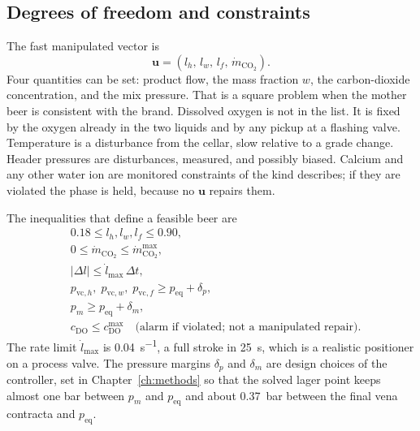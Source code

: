 \subsection{Degrees of freedom and constraints}

The fast manipulated vector is
\begin{equation}
\label{eq:u}
\mathbf{u} = (l_h,\, l_w,\, l_f,\, \dot m_{\mathrm{CO_2}}).
\end{equation}
Four quantities can be set: product flow, the mass fraction $w$, the carbon-dioxide concentration, and the mix pressure. That is a square problem when the mother beer is consistent with the brand. Dissolved oxygen is not in the list. It is fixed by the oxygen already in the two liquids and by any pickup at a flashing valve. Temperature is a disturbance from the cellar, slow relative to a grade change. Header pressures are disturbances, measured, and possibly biased. Calcium and any other water ion are monitored constraints of the kind \citet{palmer2013} describes; if they are violated the phase is held, because no $\mathbf{u}$ repairs them.

The inequalities that define a feasible beer are
\begin{align}
\label{eq:ineq}
&0.18 \le l_h,l_w,l_f \le 0.90,
\\
&0 \le \dot m_{\mathrm{CO_2}} \le \dot m_{\mathrm{CO_2}}^{\max},
\\
&|\Delta l| \le \dot l_{\max}\,\Delta t,
\\
&p_{\mathrm{vc},h},\; p_{\mathrm{vc},w},\; p_{\mathrm{vc},f} \ge p_{\mathrm{eq}} + \delta_p,
\\
&p_m \ge p_{\mathrm{eq}} + \delta_m,
\\
&c_{\mathrm{DO}} \le c_{\mathrm{DO}}^{\max}
\quad\text{(alarm if violated; not a manipulated repair)}.
\end{align}
The rate limit $\dot l_{\max}$ is \SI{0.04}{s^{-1}}, a full stroke in \SI{25}{\second}, which is a realistic positioner on a process valve. The pressure margins $\delta_p$ and $\delta_m$ are design choices of the controller, set in Chapter~\ref{ch:methods} so that the solved lager point keeps almost one bar between $p_m$ and $p_{\mathrm{eq}}$ and about \SI{0.37}{bar} between the final vena contracta and $p_{\mathrm{eq}}$.

